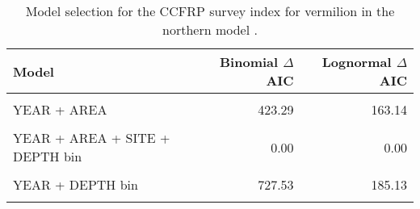 \documentclass[
]{article}
\begin{document}
\begin{table}

\caption{\label{tab:tab-model-select-ccfrp}Model selection for the CCFRP survey index for vermilion in the northern model .}
\centering
\begin{tabular}[t]{lrr}
\toprule
Model & Binomial $\Delta$AIC & Lognormal $\Delta$AIC\\
\midrule
\cellcolor{gray!6}{1} & \cellcolor{gray!6}{1071.49} & \cellcolor{gray!6}{485.95}\\
YEAR + AREA & 423.29 & 163.14\\
\cellcolor{gray!6}{YEAR + AREA + SITE} & \cellcolor{gray!6}{79.34} & \cellcolor{gray!6}{40.23}\\
YEAR + AREA + SITE + DEPTH bin & 0.00 & 0.00\\
\cellcolor{gray!6}{YEAR + SITE + DEPTH bin} & \cellcolor{gray!6}{470.88} & \cellcolor{gray!6}{88.31}\\
\addlinespace
YEAR + DEPTH bin & 727.53 & 185.13\\
\cellcolor{gray!6}{YEAR + AREA + DEPTH bin} & \cellcolor{gray!6}{292.96} & \cellcolor{gray!6}{113.84}\\
\bottomrule
\end{tabular}
\end{table}

\FloatBarrier
\end{document}
